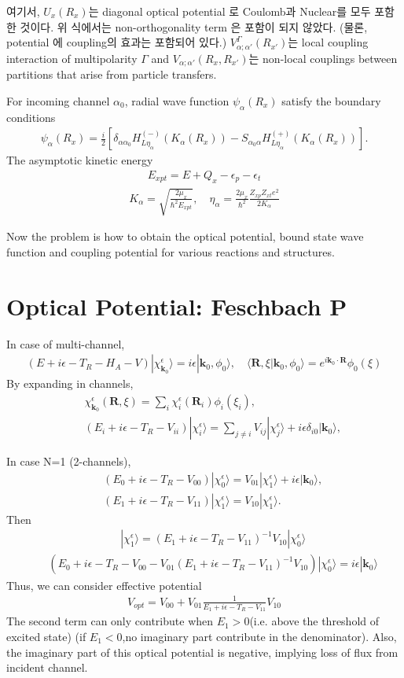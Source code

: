 \documentclass[11pt]{book}
\def\bm{\boldsymbol}
\def\vk{{\bm k}}
\def\vR{{\bm R}}
\def\la{\langle}
\def\ra{\rangle}
\newcommand{\bea}{\begin{eqnarray}}
\newcommand{\eea}{\end{eqnarray}}
\newcommand{\no}{\nonumber \\}
\begin{document}
여기서, $U_x(R_x)$는 diagonal optical potential 로 Coulomb과 Nuclear를 모두 
포함한 것이다. 위 식에서는 non-orthogonality term 은 포함이 되지 않았다. 
(물론, potential 에 coupling의 효과는 포함되어 있다.)
$V^{\Gamma}_{\alpha;\alpha'}(R_{x'})$는 local coupling interaction of multipolarity
$\Gamma$ and $V_{\alpha;\alpha'}(R_x,R_{x'})$는 non-local 
couplings between partitions that arise from particle transfers. 

For incoming channel $\alpha_0$, radial wave function $\psi_\alpha(R_x)$
satisfy the boundary conditions
\bea 
\psi_\alpha(R_{x})
=\frac{i}{2}[\delta_{\alpha\alpha_0} H^{(-)}_{L\eta_\alpha}(K_\alpha(R_x))
             -S_{\alpha_0\alpha} H^{(+)}_{L\eta_\alpha}(K_\alpha(R_x))].
\eea 
The asymptotic kinetic energy
\bea 
E_{xpt}=E+Q_x-\epsilon_p-\epsilon_t
\eea 
\bea 
K_\alpha=\sqrt{\frac{2\mu_x}{\hbar^2 E_{xpt}}},
\quad \eta_\alpha=\frac{2\mu_x}{\hbar^2}\frac{Z_{xp} Z_{xt} e^2}{2 K_\alpha}
\eea 

Now the problem is how to obtain 
the optical potential, bound state wave function
and coupling potential for various reactions and structures.

\section{Optical Potential: Feschbach P}
In case of multi-channel,
\bea 
(E+i\epsilon-T_R-H_A-V)|\chi^\epsilon_{\vk_0}\ra = i\epsilon |\vk_0,\phi_0\ra,
\quad 
\la \vR,\xi|\vk_0,\phi_0\ra =e^{i\vk_0\cdot\vR}\phi_0(\xi)
\eea  
By expanding in channels,
\bea 
& &\chi^\epsilon_{\vk_0}(\vR,\xi)=\sum_i \chi_i^\epsilon(\vR_i)\phi_i(\xi_i) ,\no 
& &(E_i+i\epsilon-T_R-V_{ii})|\chi_i^\epsilon\ra =\sum_{j\neq i} V_{ij}|\chi_j^\epsilon\ra 
  +i\epsilon \delta_{i0}|\vk_0\ra, 
\eea 

In case N=1 (2-channels),
\bea 
& &(E_0+i\epsilon-T_R-V_{00})|\chi_0^\epsilon\ra =V_{01}|\chi_1^\epsilon\ra +i\epsilon |\vk_0\ra, \no 
& &(E_1+i\epsilon-T_R-V_{11})|\chi_1^\epsilon\ra =V_{10}|\chi_1^\epsilon\ra .
\eea 
Then
\bea 
& &|\chi_1^\epsilon\ra =(E_1+i\epsilon-T_R-V_{11})^{-1} V_{10} |\chi_0^\epsilon\ra 
\eea 
\bea 
& &(E_0+i\epsilon-T_R-V_{00}-V_{01}(E_1+i\epsilon-T_R-V_{11})^{-1} V_{10})|\chi_0^\epsilon\ra 
  =i\epsilon |\vk_0\ra 
\eea 
Thus, we can consider effective potential
\bea 
V_{opt}= V_{00}+V_{01}\frac{1}{E_1+i\epsilon-T_R-V_{11}} V_{10}
\eea 
The second term can only contribute when $E_1>0$(i.e. above the threshold of excited state)
(if $E_1<0$,no imaginary part contribute in the denominator). 
Also, the imaginary part of this optical potential is negative, implying loss of flux
from incident channel. 
\end{document}
